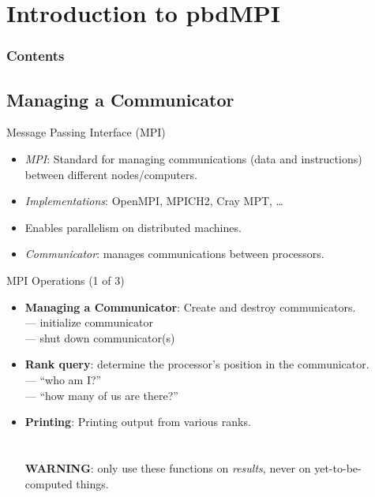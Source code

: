 \section[pbdMPI]{Introduction to pbdMPI}

\hidenum
\begin{frame}[noframenumbering]
\frametitle{Contents}
 \tableofcontents[currentsection,hideothersubsections,sectionstyle=show/hide]
\end{frame}
\shownum

\subsection{Managing a Communicator}

\begin{frame}
  \begin{block}{Message Passing Interface (MPI)}\pause
    \begin{itemize}
      \item \textit{MPI}: Standard for managing communications (data and instructions) between different nodes/computers.
      \item \textit{Implementations}:  OpenMPI, MPICH2, Cray MPT, \dots
      \item Enables parallelism on distributed machines.
      \item \textit{Communicator}: manages communications between processors.
    \end{itemize}
  \end{block}
\end{frame}


\begin{frame}
  \begin{block}{MPI Operations (1 of 3)}\pause
    \begin{itemize}
      \item \textbf{Managing a Communicator}:  Create and destroy communicators.\\
       --- initialize communicator\\
       --- shut down communicator(s)
      \\[.4cm]
      \item \textbf{Rank query}: determine the processor's position in the communicator.\\
       --- ``who am I?''\\
       --- ``how many of us are there?''\\[.4cm]
      \item \textbf{Printing}:  Printing output from various ranks.\\
      \\
      \\
      \textbf{WARNING}: only use these functions on \emph{results}, never on yet-to-be-computed things.\\
    \end{itemize}
  \end{block}
\end{frame}


